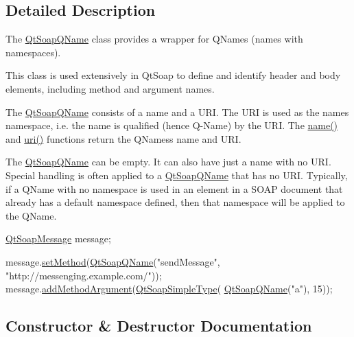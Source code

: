 \subsection{Detailed Description}
The \mbox{\hyperlink{class_qt_soap_q_name}{Qt\+Soap\+Q\+Name}} class provides a wrapper for Q\+Names (names with namespaces). 

This class is used extensively in Qt\+Soap to define and identify header and body elements, including method and argument names.

The \mbox{\hyperlink{class_qt_soap_q_name}{Qt\+Soap\+Q\+Name}} consists of a name and a U\+RI. The U\+RI is used as the name\textquotesingle{}s namespace, i.\+e. the name is qualified (hence \textquotesingle{}Q\textquotesingle{}-\/\+Name) by the U\+RI. The \mbox{\hyperlink{class_qt_soap_q_name_ab788bc414e5709a56e2f8db2403028b7}{name()}} and \mbox{\hyperlink{class_qt_soap_q_name_afff764342a9182afa6c67fdf3a193a6b}{uri()}} functions return the Q\+Names\textquotesingle{}s name and U\+RI.

The \mbox{\hyperlink{class_qt_soap_q_name}{Qt\+Soap\+Q\+Name}} can be empty. It can also have just a name with no U\+RI. Special handling is often applied to a \mbox{\hyperlink{class_qt_soap_q_name}{Qt\+Soap\+Q\+Name}} that has no U\+RI. Typically, if a Q\+Name with no namespace is used in an element in a S\+O\+AP document that already has a default namespace defined, then that namespace will be applied to the Q\+Name.


\begin{DoxyCode}
\mbox{\hyperlink{class_qt_soap_message}{QtSoapMessage}} message;

message.\mbox{\hyperlink{class_qt_soap_message_a792f4e366d4bf4c3ca09ea6f034237b5}{setMethod}}(\mbox{\hyperlink{class_qt_soap_q_name_a4a96c28ad8c0ff72a3353048c5414912}{QtSoapQName}}(\textcolor{stringliteral}{"sendMessage"}, \textcolor{stringliteral}{"http://messenging.example.com/"}));
message.\mbox{\hyperlink{class_qt_soap_message_a07c31536525e366258d54c75d955de50}{addMethodArgument}}(\mbox{\hyperlink{class_qt_soap_simple_type}{QtSoapSimpleType}}(
      \mbox{\hyperlink{class_qt_soap_q_name_a4a96c28ad8c0ff72a3353048c5414912}{QtSoapQName}}(\textcolor{stringliteral}{"a"}), 15));
\end{DoxyCode}
 

\subsection{Constructor \& Destructor Documentation}
\mbox{\label{class_qt_soap_q_name_a4a96c28ad8c0ff72a3353048c5414912}} 
